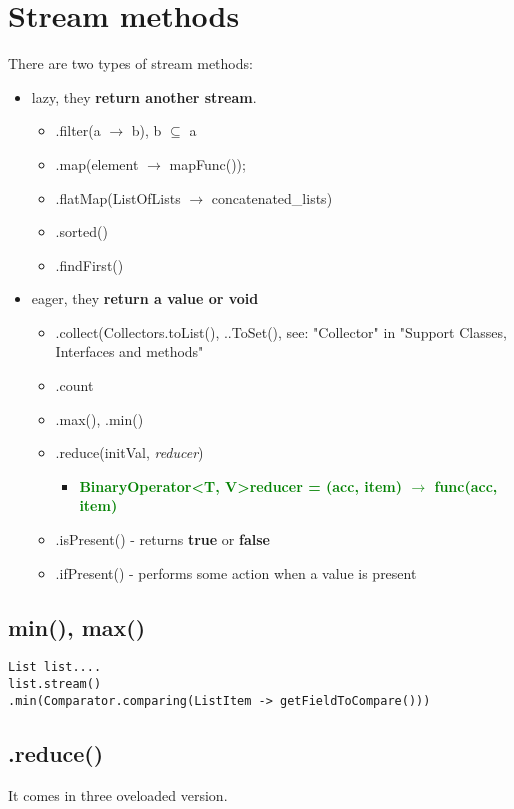 \documentclass{report}
\begin{document}
\chapter{Stream methods}
There are two types of stream methods:
\begin{itemize}
	\item lazy, they \textbf{return another stream}.
	\begin{itemize}
		\item  .filter(a $\rightarrow$ b), b $\subseteq$ a
		\item .map(element  $\rightarrow$ mapFunc());
		\item .flatMap(ListOfLists  $\rightarrow$ concatenated\_lists)
		\item.sorted()
		\item .findFirst()
	\end{itemize}
	
	\item  eager, they \textbf{return a value or void}
	\begin{itemize}
		\item  .collect(Collectors.toList(), ..ToSet(), see: "Collector" in "Support Classes, Interfaces
		and methods"
		\item .count
		\item .max(), .min()
		\item .reduce(initVal, \textit{reducer})
         \begin{itemize}
         	\item \textbf{\textcolor{green}{BinaryOperator\textless T, V\textgreater  reducer = (acc, item) $\rightarrow$ func(acc, item)}}
         \end{itemize}
     \item .isPresent() - returns \textbf{true} or \textbf{false}
     \item .ifPresent() - performs some action when a value is present
	\end{itemize}
\end{itemize}

\section{min(), max()}
\begin{verbatim}
List list....
list.stream()
.min(Comparator.comparing(ListItem -> getFieldToCompare()))
\end{verbatim}

\section{.reduce()}
It comes in three oveloaded version.
\end{document}
